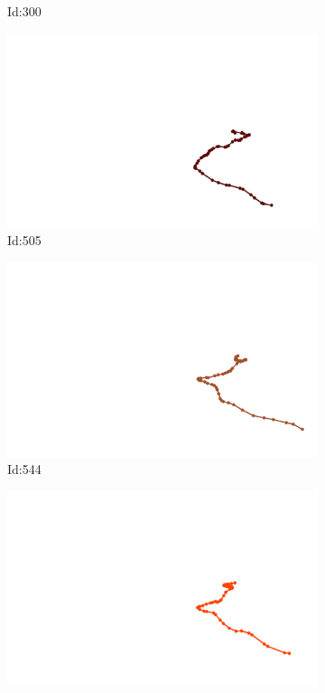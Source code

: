 \documentclass[12pt,twoside]{report}
\begin{document}
\begin{figure}
\begin{subfigure}[b]{0.20\textwidth}
\caption{Id:300}
\end{subfigure}
\begin{subfigure}[b]{0.20\textwidth}
\centering
\includegraphics[width=\textwidth]{../../trajectories/505.png}
\caption{Id:505}
\end{subfigure}
\begin{subfigure}[b]{0.20\textwidth}
\centering
\includegraphics[width=\textwidth]{../../trajectories/544.png}
\caption{Id:544}
\end{subfigure}
\begin{subfigure}[b]{0.20\textwidth}
\centering
\includegraphics[width=\textwidth]{../../trajectories/597.png}

\end{subfigure}
\end{figure}
\end{document}
